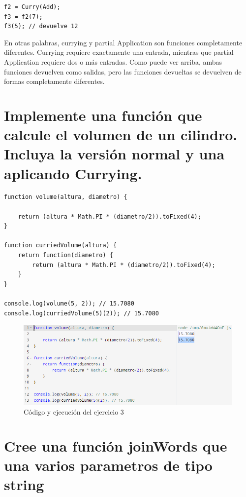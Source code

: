\documentclass{article}
\begin{document}
\begin{verbatim}
f2 = Curry(Add);
f3 = f2(7);
f3(5); // devuelve 12
\end{verbatim}

En otras palabras, currying y partial Application son  funciones completamente diferentes. Currying requiere exactamente una entrada, mientras que partial Application requiere dos o más entradas. Como puede ver arriba, ambas funciones devuelven como salidas, pero las funciones devueltas se devuelven de formas completamente diferentes.

\section{Implemente una función que calcule el volumen de un cilindro. Incluya la versión normal y una aplicando Currying.}

\begin{verbatim}
function volume(altura, diametro) {
    
    return (altura * Math.PI * (diametro/2)).toFixed(4);
}

function curriedVolume(altura) {
    return function(diametro) {
        return (altura * Math.PI * (diametro/2)).toFixed(4);
    }
}

console.log(volume(5, 2)); // 15.7080
console.log(curriedVolume(5)(2)); // 15.7080
\end{verbatim}

\begin{figure}
\centering
\includegraphics[width=1\textwidth]{ejercicio3.png}
\caption{\label{fig:frog}Código y ejecución del ejercicio 3}
\end{figure}

\section{Cree una función joinWords que una varios parametros de tipo string}
\end{document}
